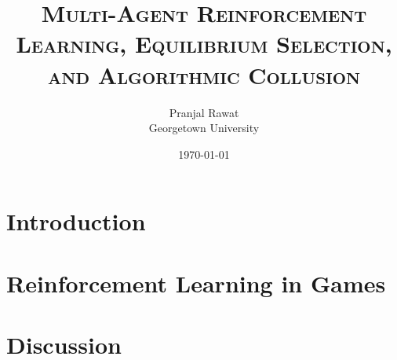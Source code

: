 %





\title{\textsc{Multi-Agent Reinforcement Learning, Equilibrium Selection,\\ and Algorithmic Collusion}}
\author{Pranjal Rawat \\ Georgetown University}
\date{\today}

\maketitle

\begin{abstract}
\noindent
\end{abstract}

\tableofcontents
\newpage

\section{Introduction}\label{section:intro}

\section{Reinforcement Learning in Games}\label{section:rl_games}


\section{Discussion}\label{section:conclusion}





